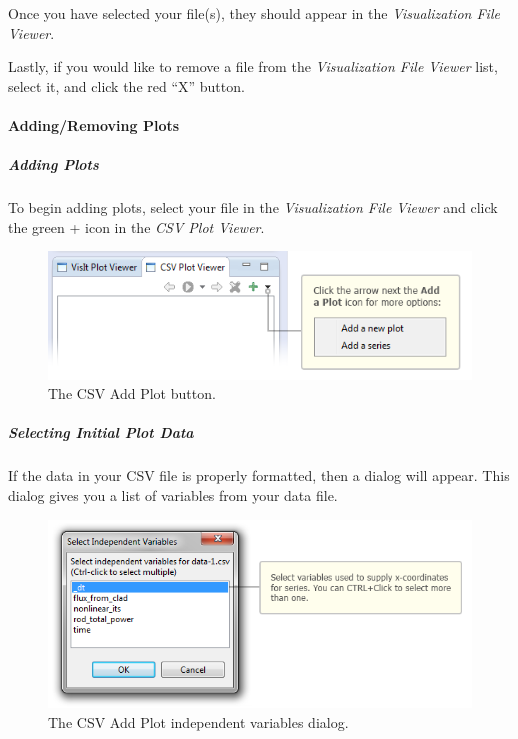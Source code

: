 Once you have selected your file(s), they should appear in the
\emph{Visualization File Viewer}.

Lastly, if you would like to remove a file from the \emph{Visualization
File Viewer} list, select it, and click the red ``X'' button.

\paragraph{Adding/Removing Plots}\label{addingremoving-plots-1}

\subparagraph{Adding Plots}\label{adding-plots}

To begin adding plots, select your file in the \emph{Visualization File
Viewer} and click the green + icon in the \emph{CSV Plot Viewer}.

\begin{figure}[htbp]
\centering
\includegraphics[width=\textwidth]{figures/ICE_CSVAddPlotButton.png}
\caption{The CSV Add Plot button.}
\end{figure}

\subparagraph{Selecting Initial Plot
Data}\label{selecting-initial-plot-data}

If the data in your CSV file is properly formatted, then a dialog will
appear. This dialog gives you a list of variables from your data file.

\begin{figure}[htbp]
\centering
\includegraphics[width=\textwidth]{figures/ICE_CSVAddPlotDialog-XAxisVariables.png}
\caption{The CSV Add Plot independent variables dialog. }
\end{figure}

